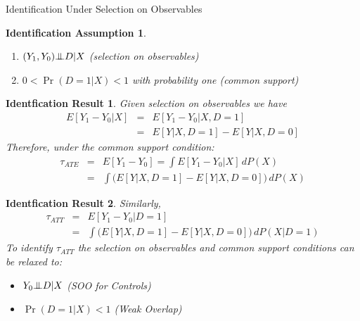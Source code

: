 \documentclass{beamer}
\numberwithin{equation}{section}
\newtheorem{iass}{Identification Assumption}
\newtheorem{ires}{Identfication Result}
\newcommand{\indep}{{\bot\negthickspace\negthickspace\bot}}
\begin{document}
\begin{frame}{Identification Under Selection on Observables}

\begin{iass}
\begin{enumerate}\small
\item $(Y_1,Y_0) \indep D |X$ (selection on observables)
\item $0<\Pr(D=1|X)<1$ with probability one (common support)
\end{enumerate}
\end{iass}

\vspace{-.2in}

\begin{overprint}
\begin{ires}\small
Given selection on observables we have
\begin{eqnarray}
E[Y_1-Y_0|X]&=&E[Y_1-Y_0|X,D=1]\nonumber\\
           &=& E[Y|X,D=1]-E[Y|X,D=0]\nonumber
\end{eqnarray}
Therefore, under the common support condition:
\begin{eqnarray}
\tau_{ATE}&=&E[Y_1-Y_0] = \int E[Y_1-Y_0|X]\,dP(X)\nonumber\\
           &=& \int \big(E[Y|X,D=1]-E[Y|X,D=0]\big)\,dP(X)\nonumber
\end{eqnarray}
\end{ires}
\begin{ires}\small
Similarly,
\begin{eqnarray}
\tau_{ATT}&=&E[Y_1-Y_0|D=1]\nonumber\\
&=&\int \big(E[Y|X,D=1]-E[Y|X,D=0]\big)\,dP(X|D=1)\nonumber
\end{eqnarray}
To identify $\tau_{ATT}$ the selection on observables
and common support conditions can be relaxed to: \begin{itemize}
\item $Y_0\indep D | X$ (SOO for Controls)
\item $\Pr(D=1|X)<1$ (Weak Overlap)
\end{itemize}
\end{ires}
\end{overprint}

\end{frame}
\end{document}
